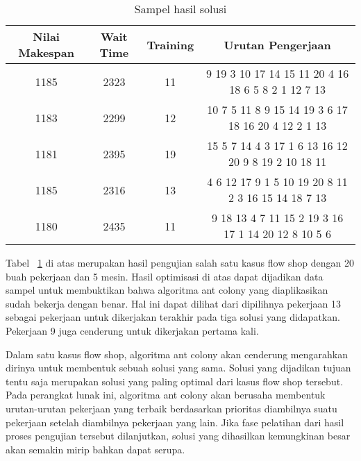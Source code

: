 \begin{table}[H]
	\centering
	\caption{Sampel hasil solusi}
	\begin{tabular}{cccc}
		\toprule
		Nilai Makespan & Wait Time & Training & Urutan Pengerjaan \\
		\midrule
		1185  & 2323  & 11    & 9 19 3 10 17 14 15 11 20 4 16 18 6 5 8 2 1 12 7 13  \\
		\midrule
		1183  & 2299  & 12    & 10 7 5 11 8 9 15 14 19 3 6 17 18 16 20 4 12 2 1 13  \\
		\midrule
		1181  & 2395  & 19    & 15 5 7 14 4 3 17 1 6 13 16 12 20 9 8 19 2 10 18 11  \\
		\midrule
		1185  & 2316  & 13    & 4 6 12 17 9 1 5 10 19 20 8 11 2 3 16 15 14 18 7 13  \\
		\midrule
		1180  & 2435  & 11    & 9 18 13 4 7 11 15 2 19 3 16 17 1 14 20 12 8 10 5 6  \\
		\bottomrule
	\end{tabular}%
	\label{tab:sampelsolusi}%
\end{table}%

Tabel ~\ref{tab:sampelsolusi} di atas merupakan hasil pengujian salah satu kasus flow shop dengan 20 buah pekerjaan dan 5 mesin. Hasil optimisasi di atas dapat dijadikan data sampel untuk membuktikan bahwa algoritma ant colony yang diaplikasikan sudah bekerja dengan benar. Hal ini dapat dilihat dari dipilihnya
pekerjaan 13 sebagai pekerjaan untuk dikerjakan terakhir pada tiga solusi yang didapatkan. Pekerjaan 9 juga cenderung untuk dikerjakan pertama kali.

Dalam satu kasus flow shop, algoritma ant colony akan cenderung mengarahkan dirinya untuk membentuk sebuah solusi yang sama. Solusi yang dijadikan tujuan tentu saja merupakan solusi yang paling optimal dari kasus flow shop tersebut. Pada perangkat lunak ini, algoritma ant colony akan berusaha membentuk urutan-urutan pekerjaan yang terbaik berdasarkan prioritas diambilnya suatu pekerjaan setelah diambilnya pekerjaan yang lain. Jika fase pelatihan dari hasil proses pengujian tersebut dilanjutkan, solusi yang dihasilkan kemungkinan besar akan semakin mirip bahkan dapat serupa.






